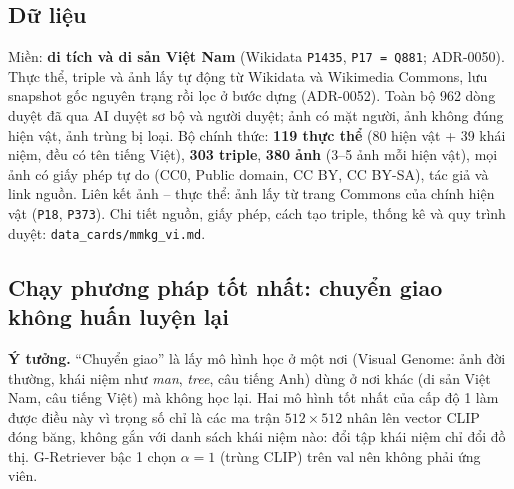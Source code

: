\documentclass[12pt, a4paper]{article}
\newcommand{\code}[1]{\texttt{#1}}
\begin{document}
\subsection{Dữ liệu}
Miền: \textbf{di tích và di sản Việt Nam} (Wikidata \code{P1435}, \code{P17 = Q881}; ADR-0050). Thực thể, triple và ảnh lấy tự động từ Wikidata và Wikimedia Commons, lưu snapshot gốc nguyên trạng rồi lọc ở bước dựng (ADR-0052). Toàn bộ 962 dòng duyệt đã qua AI duyệt sơ bộ và người duyệt; ảnh có mặt người, ảnh không đúng hiện vật, ảnh trùng bị loại. Bộ chính thức: \textbf{119 thực thể} (80 hiện vật + 39 khái niệm, đều có tên tiếng Việt), \textbf{303 triple}, \textbf{380 ảnh} (3--5 ảnh mỗi hiện vật), mọi ảnh có giấy phép tự do (CC0, Public domain, CC BY, CC BY-SA), tác giả và link nguồn. Liên kết ảnh -- thực thể: ảnh lấy từ trang Commons của chính hiện vật (\code{P18}, \code{P373}). Chi tiết nguồn, giấy phép, cách tạo triple, thống kê và quy trình duyệt: \code{data\_cards/mmkg\_vi.md}.

\subsection{Chạy phương pháp tốt nhất: chuyển giao không huấn luyện lại}
\textbf{Ý tưởng.} ``Chuyển giao'' là lấy mô hình học ở một nơi (Visual Genome: ảnh đời thường, khái niệm như \emph{man}, \emph{tree}, câu tiếng Anh) dùng ở nơi khác (di sản Việt Nam, câu tiếng Việt) mà không học lại. Hai mô hình tốt nhất của cấp độ 1 làm được điều này vì trọng số chỉ là các ma trận $512\times512$ nhân lên vector CLIP đóng băng, không gắn với danh sách khái niệm nào: đổi tập khái niệm chỉ đổi đồ thị. G-Retriever bậc 1 chọn $\alpha=1$ (trùng CLIP) trên val nên không phải ứng viên.
\end{document}
